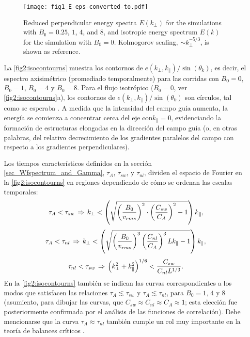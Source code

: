 \begin{figure}
  \centering
  \texttt{[image: fig1\_E-eps-converted-to.pdf]}
  \caption{Reduced perpendicular energy spectra $E(k_\perp)$ for the
    simulations with $B_0=0.25$, $1$, $4$, and $8$, and isotropic energy
    spectrum $E(k)$ for the simulation with $B_0=0$. Kolmogorov
    scaling, $\sim k_\perp^{-5/3}$, is shown as reference.}
  \label{fig1:E}
\end{figure}


La \cref{fig2:isocontourns} muestra los contornos de
$e(k_\perp,k_\parallel)/\sin(\theta_k)$, es decir, el espectro
axisimétrico (promediado temporalmente) para las corridas con $B_0=0$,
$B_0=1$, $B_0=4$ y $B_0=8$. Para el flujo isotrópico ($B_0=0$, ver
\cref{fig2:isocontourns}a), los contornos de
$e(k_\perp,k_\parallel)/\sin(\theta_k)$ son círculos, tal como se
esperaba \cite{mininni_isotropization_2012}.  A medida que la
intensidad del campo guía aumenta, la energía se comienza a concentrar
cerca del eje con$k_\parallel=0$, evidenciando la formación de
estructuras elongadas en la dirección del campo guía (o, en otras
palabras, del relativo decrecimiento de los gradientes paralelos del
campo con respecto a los gradientes perpendiculares).

Los tiempos característicos definidos en la sección \ref{sec_Wfspectrum_and_Gamma}, $\tau_A$,
$\tau_{sw}$, y $\tau_{nl}$, dividen el espacio de Fourier en la \cref{fig2:isocontourns} en regiones dependiendo de cómo se ordenan las escalas temporales:
\begin{equation}\label{eq:Asw} \tau_A < \tau_{sw} \hspace{0.05cm}
\Rightarrow \hspace{0.05cm} k_\perp <
\left(\sqrt{\left(\frac{B_0}{v_{rms}}\right)^2 \cdot
\left(\frac{C_{sw}}{C_A}\right)^2 - 1} \right) k_\parallel,
\end{equation}
\begin{equation}\label{eq:Anl} \tau_A < \tau_{nl} \hspace{0.05cm}
\Rightarrow \hspace{0.05cm} k_\perp <
\left(\sqrt{\left(\frac{B_0}{v_{rms}}\right)^3
\left(\frac{C_{nl}}{C_A}\right)^3 Lk_\parallel - 1} \right) 
k_\parallel,
\end{equation}
\begin{equation}\label{eq:nlsw} \tau_{nl} < \tau_{sw} \hspace{0.05cm}
\Rightarrow \hspace{0.05cm} \left( k_\perp^2 + k_\parallel^2
\right)^{1/6} < \frac{C_{sw}}{C_{nl}L^{1/3}}.
\end{equation}
En la \cref{fig2:isocontourns} también se indican las curvas
correspondientes a los modos que satisfacen las relaciones
$\tau_A\lesssim\tau_{sw}$ y $\tau_A\lesssim\tau_{nl}$, para $B_0=1$,
$4$ y $8$ (asumiento, para dibujar las curvas, que $C_{sw} \approx
C_{nl} \approx C_A \approx 1$; esta elección fue posteriormente
confirmada por el análisis de las funciones de correlación). Debe
mencionarse que la curva $\tau_A\approx\tau_{nl}$ también cumple un
rol muy importante en la teoría de balances críticos
\cite{sridhar_toward_1994}.

